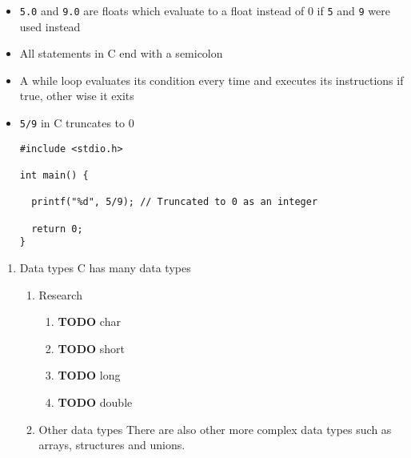 \documentclass[11pt]{article}
\begin{document}
\begin{itemize}
\item \texttt{5.0} and \texttt{9.0} are floats which evaluate to a float instead of 0 if \texttt{5} and \texttt{9} were used instead
\item All statements in C end with a semicolon
\item A while loop evaluates its condition every time and executes its instructions if true, other wise it exits
\item \texttt{5/9} in C truncates to 0
\begin{verbatim}
#include <stdio.h>

int main() {

  printf("%d", 5/9); // Truncated to 0 as an integer

  return 0;
}
\end{verbatim}
\end{itemize}

\begin{enumerate}
\item Data types
\label{sec-1-1-2-1}
C has many data types

\begin{enumerate}
\item Research
\label{sec-1-1-2-1-1}
\begin{enumerate}
\item {\bfseries\sffamily TODO} char
\label{sec-1-1-2-1-1-1}
\item {\bfseries\sffamily TODO} short
\label{sec-1-1-2-1-1-2}
\item {\bfseries\sffamily TODO} long
\label{sec-1-1-2-1-1-3}
\item {\bfseries\sffamily TODO} double
\label{sec-1-1-2-1-1-4}
\end{enumerate}

\item Other data types
\label{sec-1-1-2-1-2}
There are also other more complex data types such as arrays, structures and unions.
\end{enumerate}
\end{enumerate}
\end{document}
